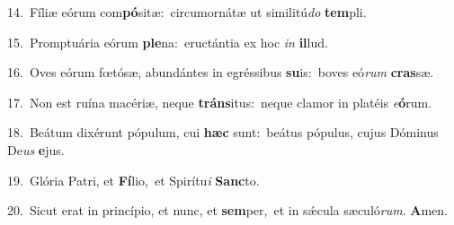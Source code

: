 {\numbfont\textcolor{\numbcolor}{14.}}~Fíliæ eórum com\-\textbf{pó}\-sitæ:~\star circumornátæ ut similitú\textit{do} \textbf{tem}\-pli.\par
{\numbfont\textcolor{\numbcolor}{15.}}~Promptuária eórum \textbf{ple}\-na:~\star eructántia ex hoc \textit{in} \textbf{il}\-lud.\par
{\numbfont\textcolor{\numbcolor}{16.}}~Oves eórum fœtósæ, abundántes in egréssibus \textbf{su}\-is:~\star boves eó\textit{rum} \textbf{cras}\-sæ.\par
{\numbfont\textcolor{\numbcolor}{17.}}~Non est ruína macériæ, neque \textbf{tráns}\-itus:~\star neque clamor in platéis \textit{e}\-\textbf{ó}rum.\par
{\numbfont\textcolor{\numbcolor}{18.}}~Beátum dixérunt pópulum, cui \textbf{hæc} sunt:~\star beátus pópulus, cujus Dóminus De\textit{us} \textbf{e}\-jus.\par
{\numbfont\textcolor{\numbcolor}{19.}}~Glória Patri, et \textbf{Fí}\-lio,~\star et Spirítu\textit{i} \textbf{Sanc}\-to.\par
{\numbfont\textcolor{\numbcolor}{20.}}~Sicut erat in princípio, et nunc, et \textbf{sem}\-per,~\star et in sǽcula sæculó\-\textit{rum}\-. \textbf{A}\-men.\par
